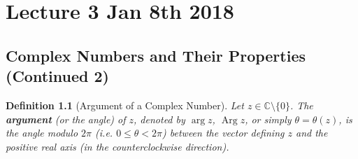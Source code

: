 \documentclass[11pt, oneside]{book}
\theoremstyle{break}
\newtheorem{defn}{Definition}[section]
\DeclareMathOperator{\re}{Re}
\DeclareMathOperator{\im}{Im}
\DeclareMathOperator{\caparg}{Arg}
\newcommand{\Arg}[1]{\caparg #1}
\begin{document}


\chapter{Lecture 3 Jan 8th 2018}
	\label{chapter:lecture_3_jan_8th_2018}

\section{Complex Numbers and Their Properties (Continued 2)} %
\label{sec:complex_numbers_and_their_properties_continued_2}

\begin{defn}[Argument of a Complex Number]\label{defn:Argument of a Complex Number}
	Let $z \in \mathbb{C} \setminus \{0\}$. The \textbf{argument} (or the angle) of $z$, denoted by $\arg{z}$, $\Arg{z}$, or simply $\theta = \theta(z)$, is the angle modulo $2 \pi$ (i.e. $0 \leq \theta < 2 \pi$) between the vector defining $z$ and the positive real axis (in the counterclockwise direction).

	\begin{center}
	\end{center}
\end{defn}
\end{document}
